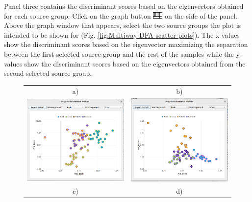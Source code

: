 \documentclass[12pt]{report}
\begin{document}
Panel three contains the discriminant scores based on the eigenvectors obtained for each source group. Click on the graph button \includegraphics[width=0.5cm]{Figures/table.png} on the side of the panel. Above the graph window that appears, select the two source groups the plot is intended to be shown for (Fig. \ref{fig:Multiway-DFA-scatter-plots}). The x-values show the discriminant scores based on the eigenvector maximizing the separation between the first selected source group and the rest of the samples while the y-values show the discriminant scores based on the eigenvectors obtained from the second selected source group.  

\begin{figure}[ht]
    \centering
    \begin{tabular}{c c}
        a) & b) \\
        \includegraphics[width=7cm]{Figures/Multiway-Scatter-Bank-Crop.png} & \includegraphics[width=7cm]{Figures/Multiway-Scatter-Bank-Forest.png} \\
        c) & d) \\

\end{tabular}
\end{figure}
\end{document}
